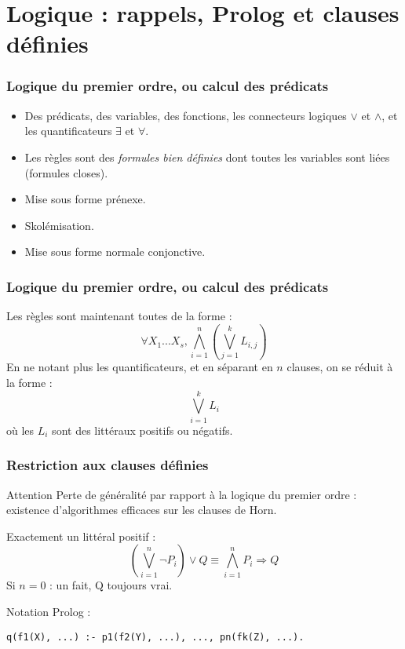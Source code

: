 \documentclass[aspectratio=43]{beamer}
\begin{document}
\section{Logique : rappels, Prolog et clauses définies}

\begin{frame}
  \frametitle{Logique du premier ordre, ou calcul des prédicats}

  \begin{itemize}
  \item Des prédicats, des variables, des fonctions, les connecteurs logiques $\vee$ et $\wedge$, et les quantificateurs $\exists$ et $\forall$.
    
  \item Les règles sont des \textit{formules bien définies} dont toutes les variables sont liées (formules closes).

  \item Mise sous forme prénexe.
    
  \item Skolémisation.

  \item Mise sous forme normale conjonctive.
  \end{itemize}
\end{frame}

\begin{frame}
  \frametitle{Logique du premier ordre, ou calcul des prédicats}
  Les règles sont maintenant toutes de la forme :
  $$\forall X_{1}...X_{s},\bigwedge_{i=1}^{n}\left(\bigvee_{j=1}^{k}L_{i,j}\right)$$
  En ne notant plus les quantificateurs, et en séparant en $n$ clauses, on se réduit à la forme :
  $$\bigvee_{i=1}^{k}L_{i}$$ où les $L_{i}$ sont des littéraux positifs ou négatifs.
\end{frame}

\begin{frame}[fragile]
  \frametitle{Restriction aux clauses définies}
  \begin{alertblock}{Attention}
    Perte de généralité par rapport à la logique du premier ordre : existence d'algorithmes efficaces sur les clauses de Horn.
  \end{alertblock}
  
  Exactement un littéral positif :
  $$\left(\bigvee_{i=1}^{n}\neg P_{i}\right)\vee{Q} \equiv \bigwedge_{i=1}^{n}P_{i}\Rightarrow Q$$
  Si $n=0$ : un fait, Q toujours vrai.

  \vspace{1em}
  
  Notation Prolog :
  \begin{verbatim}  
q(f1(X), ...) :- p1(f2(Y), ...), ..., pn(fk(Z), ...).
  \end{verbatim}
\end{frame}
\end{document}
